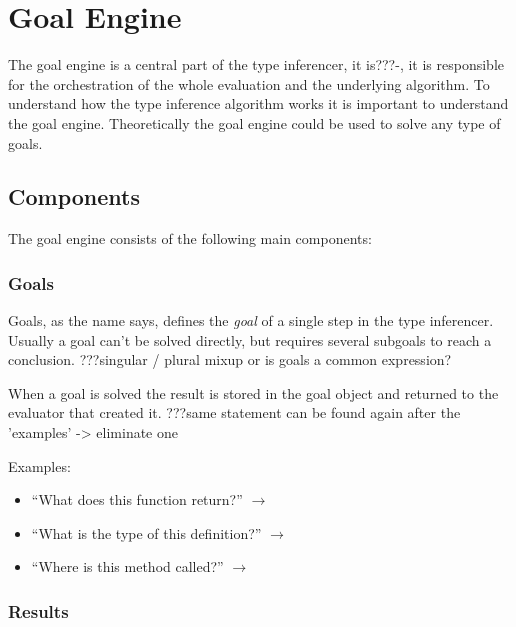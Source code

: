 \documentclass[12pt,halfparskip,DIV11,BCOR10mm]{scrreprt}
\begin{document}
\section{Goal Engine}


The goal engine is a central part of the type inferencer, it is???-, it is responsible for the orchestration of the whole evaluation and the underlying algorithm. To understand how the type inference algorithm works it is important to understand the goal engine. Theoretically the goal engine could be used to solve any type of goals.

\subsection{Components}

The goal engine consists of the following main components:

\subsubsection{Goals}

Goals, as the name says, defines the \emph{goal} of a single step in the type inferencer. Usually a goal can't be solved directly, but requires several subgoals to reach a conclusion. ???singular / plural mixup or is goals a common expression?

When a goal is solved the result is stored in the goal object and returned to the evaluator that created it. ???same statement can be found again after the 'examples' -> eliminate one

Examples:

\begin{itemize}
    \item ``What does this function return?''  $\rightarrow$  
    \item ``What is the type of this definition?'' $\rightarrow$ 
    \item ``Where is this method called?'' $\rightarrow$ 
\end{itemize}

\subsubsection{Results}
\end{document}

